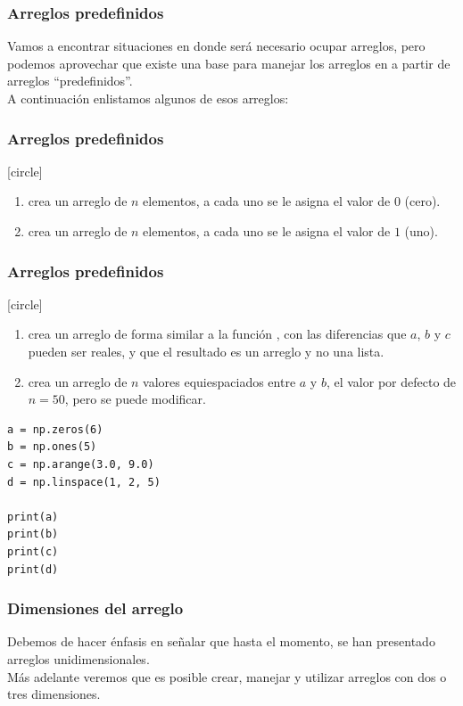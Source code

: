 \begin{frame}
\frametitle{Arreglos predefinidos}
Vamos a encontrar situaciones en donde será necesario ocupar arreglos, pero podemos aprovechar que existe una base para manejar los arreglos en \python{} a partir de arreglos \enquote{predefinidos}.
\\
\bigskip
A continuación enlistamos algunos de esos arreglos:
\end{frame}
\begin{frame}[fragile]
\frametitle{Arreglos predefinidos}
[circle]
\begin{enumerate}[<+->]
\item {} crea un arreglo de $n$ elementos, a cada uno se le asigna el valor de $0$ (cero).
\item {} crea un arreglo de $n$ elementos, a cada uno se le asigna el valor de $1$ (uno).
\seti
\end{enumerate}
\end{frame}
\begin{frame}[fragile]
\frametitle{Arreglos predefinidos}
[circle]
\begin{enumerate}[<+->]
\conti
\item {} crea un arreglo de forma similar a la función , con las diferencias que $a$, $b$ y $c$ pueden ser reales, y que el resultado es un arreglo y no una lista.
\item {} crea un arreglo de $n$ valores equiespaciados entre $a$ y $b$, el valor por defecto de $n=50$, pero se puede modificar.
\end{enumerate}
\end{frame}
\begin{frame}[fragile]
\begin{lstlisting}[caption=Ejemplos de arreglos predefinidos, basicstyle=\linespread{1.1}\ttfamily=\small, columns=fullflexible]
a = np.zeros(6)
b = np.ones(5)
c = np.arange(3.0, 9.0)
d = np.linspace(1, 2, 5)

print(a)
print(b)
print(c)
print(d)
\end{lstlisting}
\end{frame}
\begin{frame}
\frametitle{Dimensiones del arreglo}
Debemos de hacer énfasis en señalar que hasta el momento, se han presentado arreglos unidimensionales.
\\
\bigskip
Más adelante veremos que es posible crear, manejar y utilizar arreglos con dos o tres dimensiones.
\end{frame}
